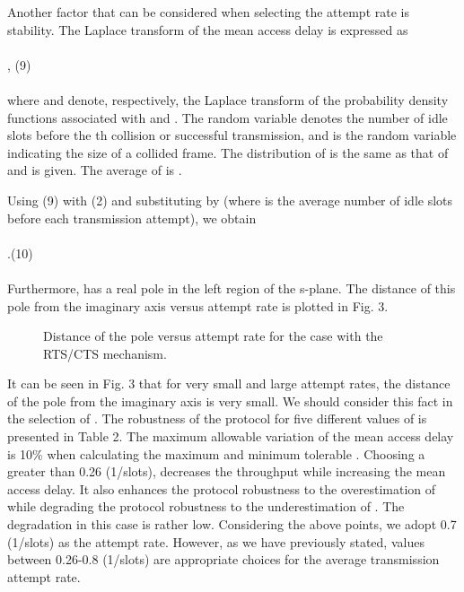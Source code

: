 \documentclass[10pt,twocolumn,oneside,submit]{JCNtran}
\begin{document}
\par Another factor that can be considered when selecting the attempt rate is stability. The Laplace transform of the mean access delay is expressed as\\
\\
, \hfill(9) \\
\\
where  and  denote, respectively, the Laplace transform of the probability density functions associated with  and . The random variable  denotes the number of idle slots before the th collision or successful transmission, and  is the random variable indicating the size of a collided frame. The distribution of  is the same as that of  and is given. The average of  is .
\par Using (9) with (2) and substituting  by  (where  is the average number of idle slots before each transmission attempt), we obtain\\
\\
.\hfill(10) \\
\\
Furthermore,  has a real pole in the left region of the s-plane. The distance of this pole from the imaginary axis versus attempt rate is plotted in Fig. 3.
\begin{figure}[t]
\begin{center}
\epsfxsize=8cm \leavevmode{} \caption{Distance of the pole versus attempt rate for the case with the RTS/CTS mechanism.} \label{fig:3}
\end{center}
\end{figure}
It can be seen in Fig. 3 that for very small and large attempt rates, the distance of the pole from the imaginary axis is very small. We should consider this fact in the selection of . The robustness of the protocol for five different values of  is presented in Table 2. The maximum allowable variation of the mean access delay is 10\% when calculating the maximum and minimum tolerable . Choosing a  greater than 0.26 (1/slots), decreases the throughput while increasing the mean access delay. It also enhances the protocol robustness to the overestimation of  while degrading the protocol robustness to the underestimation of . The degradation in this case is rather low. Considering the above points, we adopt 0.7 (1/slots) as the attempt rate. However, as we have previously stated, values between 0.26-0.8 (1/slots) are appropriate choices for the average transmission attempt rate.
\end{document}
